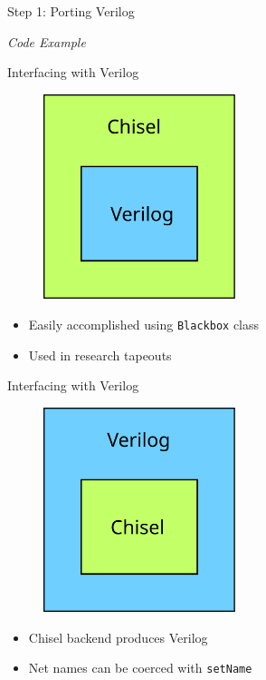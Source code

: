 \documentclass{beamer}
\begin{document}
\begin{frame}{Step 1: Porting Verilog}
  \begin{center}
    \textit{Code Example}
  \end{center}
\end{frame}

\begin{frame}{Interfacing with Verilog}
  \begin{figure}
    \centering
    \includegraphics[width=0.5\textwidth]{figs/v_in_c.svg}
  \end{figure}
  \begin{itemize}
    \item Easily accomplished using \texttt{Blackbox} class
    \item Used in research tapeouts
  \end{itemize}
\end{frame}

\begin{frame}{Interfacing with Verilog}
  \begin{figure}
    \centering
    \includegraphics[width=0.5\textwidth]{figs/c_in_v.svg}
  \end{figure}
  \begin{itemize}
    \item Chisel backend produces Verilog
    \item Net names can be coerced with \texttt{setName}
  \end{itemize}
\end{frame}
\end{document}
